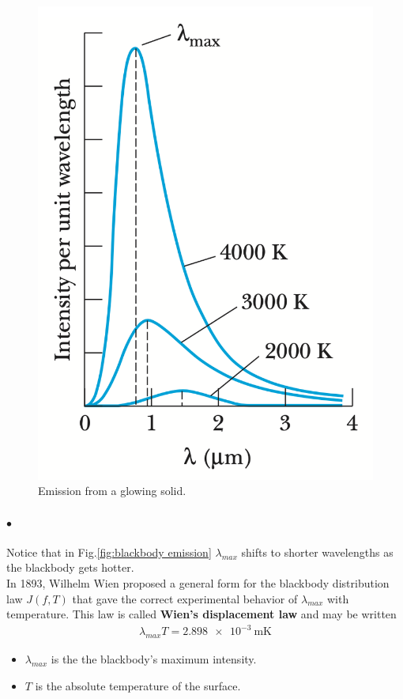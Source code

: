     \begin{figure}
        \includegraphics[width=0.9\linewidth]{figures/blackbody emission.png}
        \caption{Emission from a glowing solid.}
        \label{fig:blackbody emission}
    \end{figure}
    
    \paragraph{$\bullet$} Notice that in Fig.\eqref{fig:blackbody emission} $\lambda_{max}$ shifts
    to shorter wavelengths as the blackbody gets hotter.\\
    In 1893, Wilhelm Wien proposed a general form for the blackbody distribution law 
    $J(f, T)$ that gave the correct experimental behavior of $\lambda_{max}$ with temperature. This 
    law is called \textbf{Wien’s displacement law} and may be written
    \begin{align} \label{Wien's displacement law}
        \lambda_{max} T = \SI{2.898e-3}{\m\K}
    \end{align}
    {\tiny \begin{itemize}
        \item $\lambda_{max}$ is the the blackbody’s maximum intensity.
        \item $T$ is the absolute temperature of the surface.
    \end{itemize}}
    
